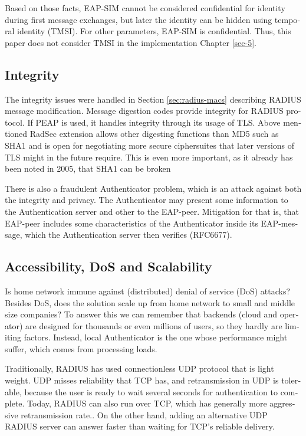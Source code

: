 \documentclass[12pt,a4paper,english]{tutthesis}
\begin{document}
\begin{otherlanguage}{english}
{Based on those facts, EAP-SIM cannot be considered confidential for identity
during first message exchanges, but later the identity can be hidden
using temporal identity (TMSI). 
For other parameters, EAP-SIM is confidential.
Thus, this paper does not consider TMSI in the implementation Chapter
\ref{sec-5}.
\subsection{Integrity}
\label{sec-6-4-2}
The integrity issues were handled in Section \ref{sec:radius-macs} describing
RADIUS message modification.
Message digestion codes provide integrity for RADIUS protocol.
If PEAP is used, it handles integrity through its usage of
 TLS\cite{peap}.
Above mentioned RadSec extension allows other digesting functions than MD5 such
as SHA1 and is open for negotiating more secure ciphersuites that later
versions of TLS might in the future require\cite{rfc6614}. This is
even more important, as it already has been noted in 2005, that SHA1 can be
broken

There is also a fraudulent Authenticator problem, which is an attack
against both the integrity and privacy.  The Authenticator may present
some information to the Authentication server and other to the
EAP-peer. Mitigation for that is, that EAP-peer includes some
characteristics of the Authenticator inside its EAP-message, which
the Authentication server then verifies (RFC6677)\cite{rfc6677}.

\subsection{Accessibility, DoS and Scalability}
\label{sec-6-4-3}

Is home network immune against (distributed) denial of service (DoS)
attacks? Besides DoS, does the solution scale up from home network to
small and middle size companies?
To answer this we can remember that backends (cloud and operator) are
designed for thousands or even millions of users, so 
they hardly are limiting factors. Instead, local
Authenticator is the one whose performance might suffer, which
comes from processing loads\cite{2009-lin-simefficiency}.


Traditionally, RADIUS has used connection\-less UDP protocol that is
light weight. UDP misses reliability that TCP has, and retransmission in UDP is
tolerable, because the user is ready to wait  several seconds for
authentication to complete. Today, RADIUS can also run over TCP, which
has generally more aggressive retransmission
rate.\cite[Section 2.2.1]{rfc5080}. 
On the other hand, adding an
alternative UDP RADIUS server can answer faster than waiting for TCP's reliable delivery.


}
\end{otherlanguage}
\end{document}
